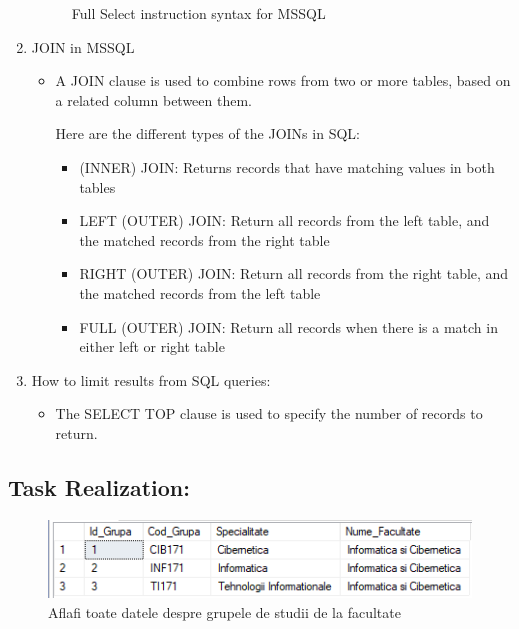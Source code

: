 \documentclass[12pt]{article}
\begin{document}
\begin{enumerate}
\begin{figure}[H]
                        \caption{Full Select instruction syntax for MSSQL}
                \end{figure}
                \vspace{0.5 cm}
                \item JOIN in MSSQL
                \begin{itemize}                 
                        \item A JOIN clause is used to combine rows from two or more tables, based on a related column between them.

                        Here are the different types of the JOINs in SQL:
                        \begin{itemize} 
                                \item (INNER) JOIN: Returns records that have matching values in both tables
                                \item LEFT (OUTER) JOIN: Return all records from the left table, and the matched records from the right table
                                \item RIGHT (OUTER) JOIN: Return all records from the right table, and the matched records from the left table
                                \item FULL (OUTER) JOIN: Return all records when there is a match in either left or right table
                        \end{itemize}
                \end{itemize}
                \item How to limit results from SQL queries:
                \begin{itemize}                 
                        \item The SELECT TOP clause is used to specify the number of records to return.   
                \end{itemize}
                
        \end{enumerate}


        \subsection*{Task Realization:}

        \begin{figure}[H]
                \centering
                \includegraphics[width=.75\textwidth]{img1.png}
                \caption{Aflafi toate datele despre grupele de studii de la facultate}
        \end{figure}
        \vspace{0.5 cm}
        
\end{document}
